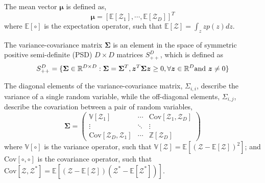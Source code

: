 The mean vector $\boldsymbol{\mu}$ is defined as,
\begin{equation}
	\boldsymbol{\mu} = [\mathbb{E}[\mathcal{Z}_1], \cdots, \mathbb{E}[\mathcal{Z}_D]]^T
\label{eq:mean_vector}
\end{equation}
where $\mathbb{E}[\circ]$ is the expectation operator, such that $\mathbb{E}[\mathcal{Z}] = \int_z z p(z) dz$.

The variance-covariance matrix $\boldsymbol{\Sigma}$ is an element in the space of symmetric positive semi-definite (PSD) $D \times D$ matrices $S_{++}^D$, which is defined as
\begin{equation}
	S_{++}^D = \{\boldsymbol{\Sigma} \in \mathbb{R}^{D\times D}: \boldsymbol{\Sigma} = \boldsymbol{\Sigma}^T, \bm{z}^T \boldsymbol{\Sigma} \bm{z} \geq 0, \forall \bm{z} \in \mathbb{R}^D \textnormal{and } \bm{z} \neq 0 \}
	\label{eq:def_covariance_matrix}
\end{equation}

The diagonal elements of the variance-covariance matrix, $\Sigma_{i,i}$, describe the variance of a single random variable,
while the off-diagonal elements, $\Sigma_{i,j}$, describe the covariation between a pair of random variables,
\begin{equation}
	\boldsymbol{\Sigma} =
	\begin{pmatrix}
			\mathbb{V}[\mathcal{Z}_1] 							 & \cdots		& \text{Cov}[\mathcal{Z}_1, \mathcal{Z}_D] \\
			\vdots                   								 & \ddots   & \vdots \\
			\text{Cov}[\mathcal{Z}_D, \mathcal{Z}_1] & \cdots 	& \mathbb{Z}[\mathcal{Z}_D]
	\end{pmatrix}
\label{eq:covariance_matrix}
\end{equation}
where $\mathbb{V} [\circ]$ is the variance operator, such that $\mathbb{V} [\mathcal{Z}] = \mathbb{E}[(\mathcal{Z} - \mathbb{E}[\mathcal{Z}])^2]$;
and $\text{Cov} [\circ, \circ]$ is the covariance operator, such that $\text{Cov} [\mathcal{Z}, \mathcal{Z}^*] = \mathbb{E}[(\mathcal{Z}-\mathbb{E}[\mathcal{Z}])(\mathcal{Z}^*-\mathbb{E}[\mathcal{Z}^*])]$.

